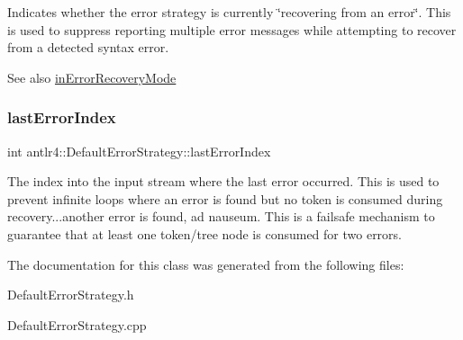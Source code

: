 Indicates whether the error strategy is currently \char`\"{}recovering from an
error\char`\"{}. This is used to suppress reporting multiple error messages while attempting to recover from a detected syntax error.

\begin{DoxySeeAlso}{See also}
\hyperlink{classantlr4_1_1DefaultErrorStrategy_a354b6e4152a68a2b7d9c1357a49ec3cc}{in\+Error\+Recovery\+Mode} 
\end{DoxySeeAlso}
\mbox{\label{classantlr4_1_1DefaultErrorStrategy_ac0c7e89ac7e3c12ca0e44f0d2bda5faa}} 
\subsubsection{\texorpdfstring{last\+Error\+Index}{lastErrorIndex}}
{\footnotesize\ttfamily int antlr4\+::\+Default\+Error\+Strategy\+::last\+Error\+Index\hspace{0.3cm}{\ttfamily [protected]}}

The index into the input stream where the last error occurred. This is used to prevent infinite loops where an error is found but no token is consumed during recovery...another error is found, ad nauseum. This is a failsafe mechanism to guarantee that at least one token/tree node is consumed for two errors. 

The documentation for this class was generated from the following files\+:\begin{DoxyCompactItemize}
\item 
Default\+Error\+Strategy.\+h\item 
Default\+Error\+Strategy.\+cpp\end{DoxyCompactItemize}
